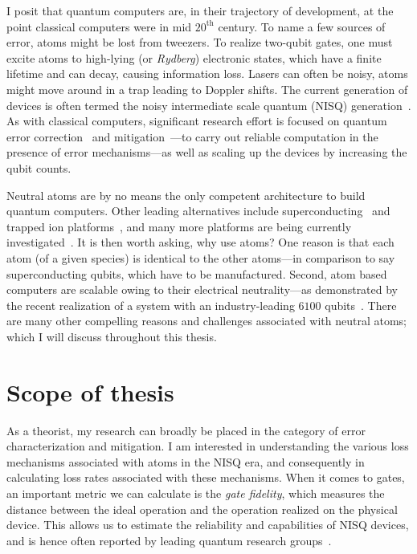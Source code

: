 \documentclass[main.tex]{subfiles}
\begin{document}
I posit that quantum computers are, in their trajectory of development, at the point classical computers were in mid $20^{\mathrm{th}}$ century. To name a few sources of error, atoms might be lost from tweezers. To realize two-qubit gates, one must excite atoms to high-lying (or \emph{Rydberg}) electronic states, which have a finite lifetime and can decay, causing information loss. Lasers can often be noisy, atoms might move around in a trap leading to Doppler shifts. The current generation of devices is often termed the noisy intermediate scale quantum (NISQ) generation~\cite{Preskill_2018}. As with classical computers, significant research effort is focused on quantum error correction~\cite{PRXQuantum.5.010333, PhysRevResearch.6.043253, pecorari2025high, reichardt2024, postema2025, pecorari2025high, stephens2014fault, brown2020parallelized, jahn2021holographic, panteleev2021quantum, PRXQuantum.5.010333, PhysRevA.108.062426} and mitigation~\cite{liao2024machine, quek2024, RevModPhys.95.045005,endo2018practical, strikis2021learning, o2023purification, bultrini2023unifying, PhysRevLett.131.210602, PhysRevLett.131.210601, PRXQuantum.3.010345, PhysRevLett.131.230601, PhysRevX.11.041036}---to carry out reliable computation in the presence of error mechanisms---as well as scaling up the devices by increasing the qubit counts.  

Neutral atoms are by no means the only competent architecture to build quantum computers. Other leading alternatives include superconducting~\cite{huang2020} and trapped ion platforms~\cite{bruzewicz2019trapped}, and many more platforms are being currently investigated~\cite{stern2013, zhang2019semiconductor, kloeffel2013, gershenfeld1998, childress2013diamond, o2007optical}. It is then worth asking, why use atoms?  One reason is that each atom (of a given species) is identical to the other atoms---in comparison to say superconducting qubits, which have to be manufactured. Second, atom based computers are scalable owing to their electrical neutrality---as demonstrated by the recent realization of a system with an industry-leading $6100$ qubits~\cite{manetsch2024}. There are many other compelling reasons and challenges associated with neutral atoms; which I will discuss throughout this thesis. 
\section{Scope of thesis}
As a theorist, my research can broadly be placed in the category of error characterization and mitigation. I am interested in understanding the various loss mechanisms associated with atoms in the NISQ era, and consequently in calculating loss rates associated with these mechanisms. When it comes to gates, an important metric we can calculate is the \emph{gate fidelity}, which measures the distance between the ideal operation and the operation realized on the physical device. This allows us to estimate the reliability and capabilities of NISQ devices, and is hence often reported by leading quantum research groups~\cite{PRXQuantum.6.020334, PhysRevLett.127.130501, graham_multi-qubit_2022, madjarov_high-fidelity_2020, PhysRevLett.121.123603, tsai2024, PhysRevLett.123.170503, PhysRevLett.121.240501, Evered_2023}. 
\end{document}
